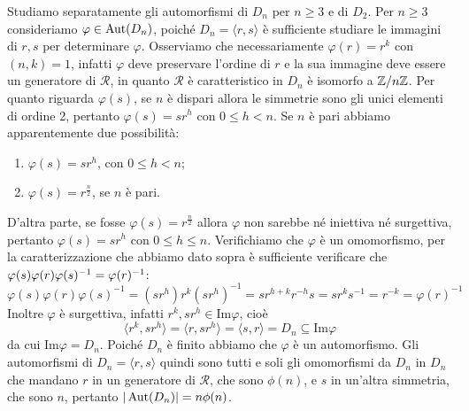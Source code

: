 \documentclass[11pt]{scrartcl}
\begin{document}
Studiamo separatamente gli automorfismi di $D_n$ per $n \geqslant 3$ e di $D_2$.\newline
Per $n\geqslant 3$ consideriamo $\varphi \in \operatorname{Aut}(D_n)$, poiché $D_n = \langle
r, s\rangle$ è sufficiente studiare le immagini di $r, s$ per determinare $\varphi$.
Osserviamo che necessariamente $\varphi(r) = r^k$ con $(n, k) = 1$, infatti 
$\varphi$ deve preservare l'ordine di $r$ e la sua immagine deve essere un 
generatore di $\mathcal{R}$, in quanto $\mathcal{R}$ è caratteristico in $D_n$
è isomorfo a ${\mathbb Z}/n{\mathbb Z}$. Per quanto riguarda $\varphi(s)$, se $n$ è dispari allora le simmetrie
sono gli unici elementi di ordine 2, pertanto $\varphi(s) = sr^h$ con 
$0\leqslant h < n$. Se $n$ è pari abbiamo apparentemente due possibilità:
\begin{enumerate}[(1)]
    \item $\varphi(s) = sr^h$, con $0\leqslant h < n$;
    \item $\varphi(s) = r^{\frac n 2}$, se $n$ è pari.
\end{enumerate}

D'altra parte, se fosse $\varphi(s) = r^{\frac n 2}$ allora $\varphi$ non
sarebbe né iniettiva né surgettiva, pertanto $\varphi(s) = sr^h$ con 
$0\leqslant h \leqslant n$. Verifichiamo che $\varphi$ è un omomorfismo, per la 
caratterizzazione che abbiamo dato sopra è sufficiente verificare che
$\varphi(s)\varphi(r)\varphi(s)^{-1} = \nolinebreak\varphi(r)^{-1}$:
\[
    \varphi(s)\varphi(r)\varphi(s)^{-1} = (sr^h)r^k(sr^h)^{-1} = sr^{h + k}r^{-h}s =
    sr^k s^{-1} = r^{-k} = \varphi(r)^{-1}
\]
Inoltre $\varphi$ è surgettiva, infatti $r^k, sr^h \in \mathrm{Im}\varphi$,
cioè 
\[
    \langle r^k, sr^h\rangle = \langle r, sr^h\rangle = \langle s, r\rangle =
    D_n\subseteq \mathrm{Im}\varphi
\]da cui $\mathrm{Im}\varphi = D_n$. Poiché $D_n$ è finito abbiamo che $\varphi$
è un automorfismo. Gli automorfismi di $D_n = \langle r, s\rangle$ quindi sono
tutti e soli gli omomorfismi da $D_n$ in $D_n$ che mandano $r$ in un generatore
di $\mathcal{R}$, che sono $\phi(n)$, e $s$ in un'altra simmetria, che sono 
$n$, pertanto $|\operatorname{Aut}(D_n)| = n\phi(n)$.\newline
\end{document}
